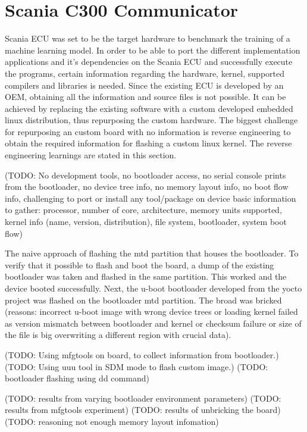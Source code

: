 \chapter{Scania C300 Communicator} \label{rtc-c300}


Scania ECU was set to be the target hardware to benchmark the training of a machine learning model. In order to be able to port the different implementation applications and it's dependencies on the Scania ECU and successfully execute the programs, certain information regarding the hardware, kernel, supported compilers and libraries is needed. Since the existing ECU is developed by an OEM, obtaining all the information and source files is not possible. 
It can be achieved by replacing the existing software with a custom developed embedded linux distribution, thus repurposing the custom hardware. 
The biggest challenge for repurposing an custom board with no information is reverse engineering to obtain the required information for flashing a custom linux kernel. The reverse engineering learnings are stated in this section.


(TODO: No development tools, no bootloader access, no serial console prints from the bootloader, no device tree info, no memory layout info, no boot flow info, challenging to port or install any tool/package on device 
basic information to gather: processor, number of core, architecture, memory units supported, kernel info (name, version, distribution), file system, bootloader, system boot flow)




The naive approach of flashing the mtd partition that houses the bootloader. To verify that it possible to flash and boot the board, a dump of the existing bootloader was taken and flashed in the same partition. This worked and the device booted successfully. Next, the u-boot bootloader developed from the yocto project was flashed on the bootloader mtd partition. The broad was bricked (reasons: incorrect u-boot image with wrong device trees or loading kernel failed as version mismatch between bootloader and kernel or checksum failure or size of the file is big overwriting a different region with crucial data).

(TODO: Using mfgtools on board, to collect information from bootloader.) 
(TODO: Using uuu tool in SDM mode to flash custom image.)
(TODO: bootloader flashing using dd command)

(TODO: results from varying bootloader environment parameters)
(TODO: results from mfgtools experiment)
(TODO: results of unbricking the board) 
(TODO: reasoning not enough memory layout infomation)
